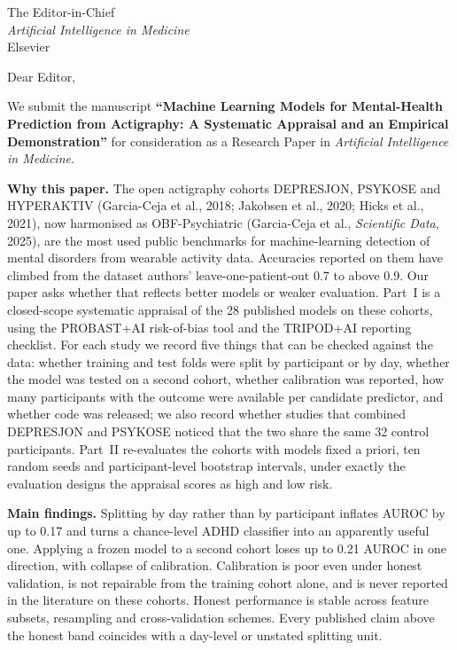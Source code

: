 \documentclass[11pt,a4paper]{letter}
\date{\today}
\begin{document}
\begin{letter}{The Editor-in-Chief\\\emph{Artificial Intelligence in Medicine}\\Elsevier}
\opening{Dear Editor,}

We submit the manuscript \textbf{``Machine Learning Models for Mental-Health Prediction from
Actigraphy: A Systematic Appraisal and an Empirical Demonstration''} for consideration as a
Research Paper in \emph{Artificial Intelligence in Medicine}.

\textbf{Why this paper.} The open actigraphy cohorts DEPRESJON, PSYKOSE and HYPERAKTIV
(Garcia-Ceja et al., 2018; Jakobsen et al., 2020; Hicks et al., 2021), now harmonised as
OBF-Psychiatric (Garcia-Ceja et al., \emph{Scientific Data}, 2025), are the most used public
benchmarks for machine-learning detection of mental disorders from wearable activity data.
Accuracies reported on them have climbed from the dataset authors' leave-one-patient-out 0.7 to
above 0.9. Our paper asks whether that reflects better models or weaker evaluation. Part~I is a
closed-scope systematic appraisal of the 28 published models on these cohorts, using the
PROBAST+AI risk-of-bias tool and the TRIPOD+AI reporting checklist. For each study we record
five things that can be checked against the data: whether training and test folds were split by
participant or by day, whether the model was tested on a second cohort, whether calibration was
reported, how many participants with the outcome were available per candidate predictor, and
whether code was released; we also record whether studies that combined DEPRESJON and PSYKOSE
noticed that the two share the same 32 control participants. Part~II re-evaluates the cohorts
with models fixed a priori, ten random seeds and participant-level bootstrap intervals, under
exactly the evaluation designs the appraisal scores as high and low risk.

\textbf{Main findings.} Splitting by day rather than by participant inflates AUROC by up to 0.17
and turns a chance-level ADHD classifier into an apparently useful one. Applying a frozen model to
a second cohort loses up to 0.21 AUROC in one direction, with collapse of calibration. Calibration
is poor even under honest validation, is not repairable from the training cohort alone, and is
never reported in the literature on these cohorts. Honest performance is stable across feature
subsets, resampling and cross-validation schemes. Every published claim above the honest band
coincides with a day-level or unstated splitting unit.


\end{letter}
\end{document}
